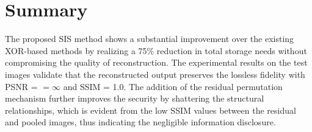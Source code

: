 \section{Summary}

The proposed SIS method shows a substantial improvement over the existing XOR-based methods by realizing a 75\% reduction in total storage needs without compromising the quality of reconstruction. The experimental results on the test images validate that the reconstructed output preserves the lossless fidelity with PSNR = $= \infty$ and SSIM = 1.0. The addition of the residual permutation mechanism further improves the security by shattering the structural relationships, which is evident from the low SSIM values between the residual and pooled images, thus indicating the negligible information disclosure.
